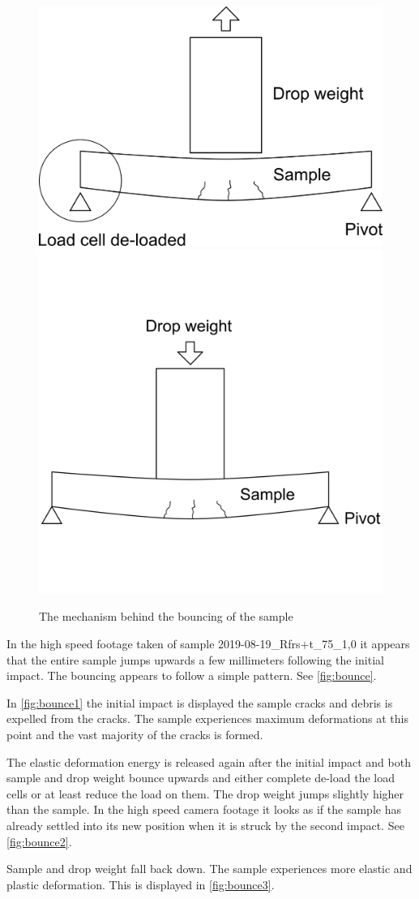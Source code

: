 \begin{figure}
    {\includegraphics[width = 0.45\linewidth]{pics/bounce_2.png}}
    {\includegraphics[width = 0.45\linewidth]{pics/bounce_3.png}}
    \caption{The mechanism behind the bouncing of the sample}
    \label{fig:bounce}
\end{figure}

In the high speed footage taken of sample 2019-08-19\_Rfrs+t\_75\_1,0 it appears that the entire sample jumps upwards a few millimeters following the initial impact. The bouncing appears to follow a simple pattern. See \autoref{fig:bounce}.

In \autoref{fig:bounce1} the initial impact is displayed the sample cracks and debris is expelled from the cracks. The sample experiences maximum deformations at this point and the  vast majority of the cracks is formed. 

The elastic deformation energy is released again after the initial impact and both sample and drop weight bounce upwards and either complete de-load the load cells or at least reduce the load on them. The drop weight jumps slightly higher than the sample. In the high speed camera footage it looks as if the sample has already settled into its new position when it is struck by the second impact. 
See \autoref{fig:bounce2}.

Sample and drop weight fall back down. The sample experiences more elastic and plastic deformation. This is displayed in \autoref{fig:bounce3}.

